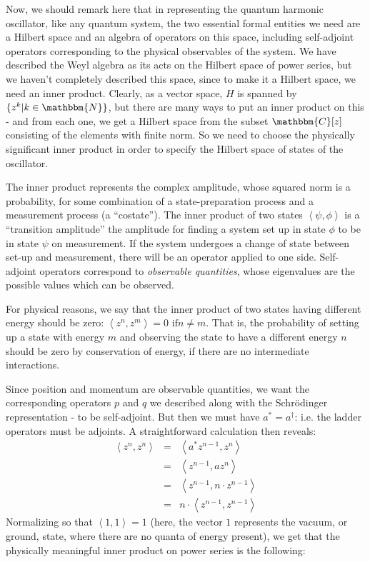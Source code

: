 \documentclass{amsart} \usepackage{amsmath,amssymb,bbm}
\newcommand{\inprod}[1]{\left\langle{#1}\right\rangle}
\begin{document}
Now, we should remark here that in representing the quantum harmonic
oscillator, like any quantum system, the two essential formal entities
we need are a Hilbert space and an algebra of operators on this space,
including self-adjoint operators corresponding to the physical
observables of the system.  We have described the Weyl algebra as its
acts on the Hilbert space of power series, but we haven't completely
described this space, since to make it a Hilbert space, we need an
inner product.  Clearly, as a vector space, $H$ is spanned by $\{ z^k
|k \in \mathbbm{N} \}$, but there are many ways to put an inner
product on this - and from each one, we get a Hilbert space from the
subset $\mathbbm{C}[z]$ consisting of the elements with finite norm.
So we need to choose the physically significant inner product in order
to specify the Hilbert space of states of the oscillator.

The inner product represents the complex amplitude, whose squared norm
is a probability, for some combination of a state-preparation process
and a measurement process (a ``costate'').  The inner product of two
states $\inprod{\psi,\phi}$ is a ``transition amplitude'' the
amplitude for finding a system set up in state $\phi$ to be in state
$\psi$ on measurement.  If the system undergoes a change of state
between set-up and measurement, there will be an operator applied to
one side.  Self-adjoint operators correspond to \textit{observable
quantities}, whose eigenvalues are the possible values which can be
observed.

For physical reasons, we say that the inner product of two states
having different energy should be zero: $\inprod{z^n,z^m}=0 \text{ if
} n \neq m$.  That is, the probability of setting up a state with
energy $m$ and observing the state to have a different energy $n$
should be zero by conservation of energy, if there are no intermediate
interactions.

Since position and momentum are observable quantities, we want the
corresponding operators $p$ and $q$ we described along with the
Schr\"odinger representation - to be self-adjoint.  But then we must
have $a^{\ast} =a^{\dagger}$: i.e. the ladder operators must be
adjoints.  A straightforward calculation then reveals:
\begin{equation}
  \begin{array}{lll}
    \inprod{z^n,z^n} & = & \inprod{a^{\ast} z^{n
    - 1},z^n} \\
     & = & \inprod{z^{n - 1},az^n}\\
     & = & \inprod{z^{n - 1}, n \cdot z^{n - 1}} \\
     &  = & n \cdot \inprod{z^{n - 1}, z^{n - 1}}
  \end{array} \label{innerproductuncat}
\end{equation} Normalizing so that $\inprod{1, 1} = 1$ (here, the
vector $1$ represents the vacuum, or ground, state, where there are no
quanta of energy present), we get that the physically meaningful inner
product on power series is the following:
\end{document}
